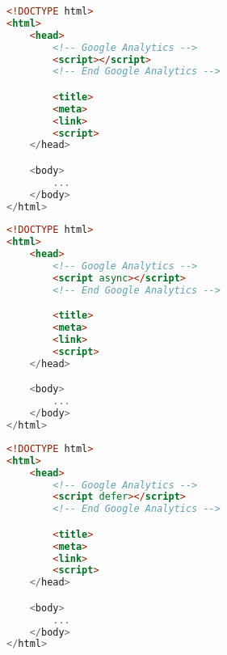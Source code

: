 \begin{sidewaysfigure}

\begin{multicols}{3}

\begin{center}
\begin{lstlisting}[caption={Attribute 1}, language=html, numbers=none]
<!DOCTYPE html>
<html>
    <head>
        <!-- Google Analytics -->
        <script></script>
        <!-- End Google Analytics -->

        <title>
        <meta>
        <link>
        <script>
    </head>

    <body>
        ...
    </body>
</html>
\end{lstlisting}
\end{center}

\columnbreak

\begin{center}
\begin{lstlisting}[caption={Attribute 2}, language=html, numbers=none]
<!DOCTYPE html>
<html>
    <head>
        <!-- Google Analytics -->
        <script async></script>
        <!-- End Google Analytics -->

        <title>
        <meta>
        <link>
        <script>
    </head>

    <body>
        ...
    </body>
</html>
\end{lstlisting}
\end{center}

\columnbreak

\begin{center}
\begin{lstlisting}[caption={Attribute 3}, language=html, numbers=none]
<!DOCTYPE html>
<html>
    <head>
        <!-- Google Analytics -->
        <script defer></script>
        <!-- End Google Analytics -->

        <title>
        <meta>
        <link>
        <script>
    </head>

    <body>
        ...
    </body>
</html>
\end{lstlisting}
\end{center}

\end{multicols}

\end{sidewaysfigure}






